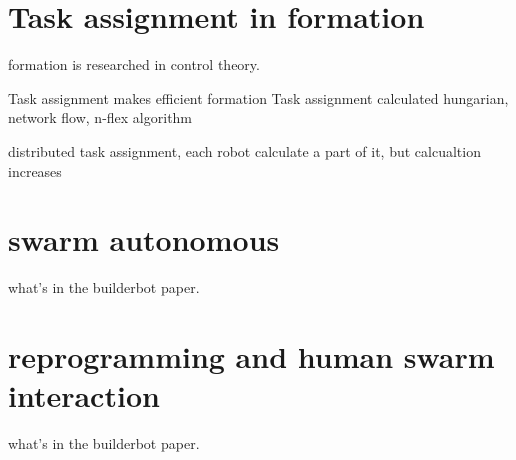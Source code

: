 \section{Task assignment in formation}

formation is researched in control theory.

Task assignment makes efficient formation
Task assignment calculated hungarian, network flow, n-flex algorithm

distributed task assignment, each robot calculate a part of it, but calcualtion increases

\section{swarm autonomous}

what's in the builderbot paper.

\section{reprogramming and human swarm interaction}

what's in the builderbot paper.







